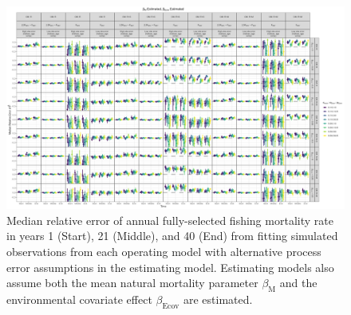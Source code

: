 \documentclass[
  12pt,
]{article}
\begin{document}
\begin{landscape}
\begin{figure}
\caption{Median relative error of annual fully-selected fishing mortality rate in years 1 (Start), 21 (Middle), and 40 (End) from fitting simulated observations from each operating model with alternative process error assumptions in the estimating model. Estimating models also assume both the mean natural mortality parameter $\beta_\text{M}$ and the environmental covariate effect $\beta_\text{Ecov}$ are estimated.}\label{F_bias_M_estimated_beta_estimated}
\begin{center}
\includegraphics[height = \textheight]{F_bias_all_PE_effect_M_estimated_beta_estimated.png}
\end{center}
\end{figure}
\end{landscape}
\end{document}
